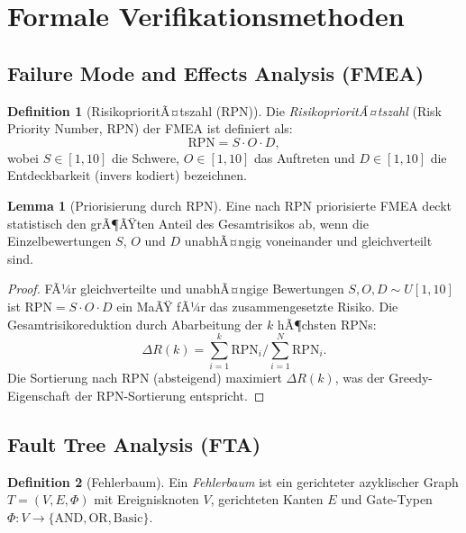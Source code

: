﻿\documentclass[a4paper,12pt]{article}
\theoremstyle{definition}
\newtheorem{definition}{Definition}
\newtheorem{lemma}{Lemma}
\begin{document}
\section{Formale Verifikationsmethoden}

\subsection{Failure Mode and Effects Analysis (FMEA)}

\begin{definition}[RisikoprioritÃ¤tszahl (RPN)]
  Die \emph{RisikoprioritÃ¤tszahl} (Risk Priority Number, RPN)
  der FMEA ist definiert als:
  \[
    \mathrm{RPN} = S \cdot O \cdot D,
  \]
  wobei $S \in [1, 10]$ die Schwere, $O \in [1, 10]$ das Auftreten
  und $D \in [1, 10]$ die Entdeckbarkeit (invers kodiert) bezeichnen.
\end{definition}

\begin{lemma}[Priorisierung durch RPN]
\label{lem:rpn}
  Eine nach RPN priorisierte FMEA deckt statistisch den grÃ¶ÃŸten
  Anteil des Gesamtrisikos ab, wenn die Einzelbewertungen $S$, $O$
  und $D$ unabhÃ¤ngig voneinander und gleichverteilt sind.
\end{lemma}

\begin{proof}
  FÃ¼r gleichverteilte und unabhÃ¤ngige Bewertungen
  $S, O, D \sim U[1, 10]$ ist $\mathrm{RPN} = S \cdot O \cdot D$
  ein MaÃŸ fÃ¼r das zusammengesetzte Risiko.
  Die Gesamtrisikoreduktion durch Abarbeitung der $k$ hÃ¶chsten RPNs:
  \[
    \Delta R(k)
    = \sum_{i=1}^{k} \mathrm{RPN}_i
      \Bigg/ \sum_{i=1}^{N} \mathrm{RPN}_i.
  \]
  Die Sortierung nach RPN (absteigend) maximiert $\Delta R(k)$,
  was der Greedy-Eigenschaft der RPN-Sortierung entspricht.
\end{proof}

\subsection{Fault Tree Analysis (FTA)}

\begin{definition}[Fehlerbaum]
  Ein \emph{Fehlerbaum} ist ein gerichteter azyklischer Graph
  $T = (V, E, \Phi)$ mit Ereignisknoten $V$, gerichteten Kanten $E$
  und Gate-Typen $\Phi: V \to \{\text{AND}, \text{OR}, \text{Basic}\}$.
\end{definition}
\end{document}
